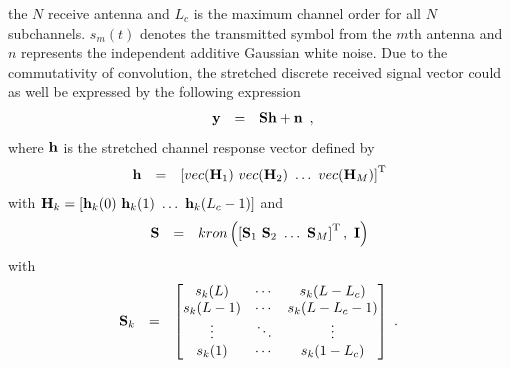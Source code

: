 \documentclass[10pt,fleqn, twocolumn]{IEEEtran}
\newcommand{\bh}{{\bf h}}
\newcommand{\bH}{{\bf H}}
\newcommand{\bn}{{\bf n}}
\newcommand{\by}{{\bf y}}
\newcommand{\bS}{{\bf S}}
\newcommand{\bI}{{\bf I}}
\begin{document}
the $N$ receive antenna and $L_{c}$ is the maximum channel order
for all $N$ subchannels. $s_m(t)$ denotes the transmitted symbol
from the $m$th antenna and $n$ represents the independent additive
Gaussian white noise. Due to the commutativity of convolution, the
stretched discrete received signal vector could as well be
expressed by the following expression
\begin{equation}\hspace{-0.00in}
\begin{array}{rcl}
\by&=&\bS\bh+\bn
\end{array},
\end{equation}
\noindent where $\bh$ is the stretched channel response vector
defined by
\begin{equation}\hspace{-0.00in}
\begin{array}{rcl}
\bh&=&\left[\mbox{vec}(\bH_{1})\ \mbox{vec}(\bH_{2})\ \ldots\
\mbox{vec}(\bH_{M})\right]^{\rm T}
\end{array}
\end{equation}
\noindent with $\bH_{k}=\left[\bh_{k}(0)\ \bh_{k}(1)\ \ldots\
\bh_{k}(L_{c}-1)\right]$ and
\begin{equation}\hspace{-0.00in}
\begin{array}{rcl}
\bS&=&\mbox{kron}\left(\left[\bS_{1}\ \bS_{2}\ \ldots\
\bS_{M}\right]^{\rm T},\ \bI\right)
\end{array}
\end{equation}
\noindent with
\begin{equation}\hspace{-0.10in}
\begin{array}{rcl}
\bS_{k}&=&\left[\begin{matrix}
s_{k}(L)&\cdots&s_{k}(L-L_{c})\\
s_{k}(L-1)&\cdots&s_{k}(L-L_{c}-1)\\
\vdots&\ddots&\vdots\\
s_{k}(1)&\cdots&s_{k}(1-L_{c})
\end{matrix}\right]
\end{array}.\label{S_k}
\end{equation}
\end{document}
